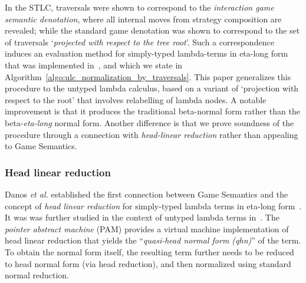 \documentclass{elsarticle}
\makeatletter
\theoremstyle{plain}
\theoremstyle{definition}
\theoremstyle{remark}
\def\etal{\textit{et al.}\@\xspace}
\makeatother
\begin{document}
In the STLC, traversals were shown to correspond to the \emph{interaction game semantic denotation}, where all internal moves from strategy composition are revealed; while the standard game denotation was shown to correspond to the set of traversals `\emph{projected with respect to the tree root}'. Such a correspondence induces an evaluation method for simply-typed lambda-terms in eta-long form~\cite{BlumPhd,BlumGalop2008,Ong-NormByTrav2015} that was implemented in~\cite{Blum-HogTool}, and which we state in Algorithm~\ref{algo:ulc_normalization_by_traversals}. This paper generalizes this procedure to the untyped lambda calculus, based on a variant of `projection with respect to the root' that involves relabelling of lambda nodes. A notable improvement is that it produces the traditional beta-normal form rather than the beta-\emph{eta-long} normal form. Another difference is that we prove soundness of the procedure through a connection with \emph{head-linear reduction} rather than appealing to Game Semantics.

\subsubsection{Head linear reduction}
Danos \etal established the first connection between Game Semantics and the concept of \emph{head linear reduction} for simply-typed lambda terms in eta-long form~\cite{danosherbelinregnier1996}. It was was further studied in the context of untyped lambda terms in~\cite{danos-head}. The \emph{pointer abstract machine} (PAM) provides a virtual machine implementation of head linear reduction that yields the ``\emph{quasi-head normal form (qhn)}'' of the term. To obtain the normal form itself, the resulting term further needs to be reduced to head normal form (via head reduction), and then normalized using standard normal reduction.
\end{document}
